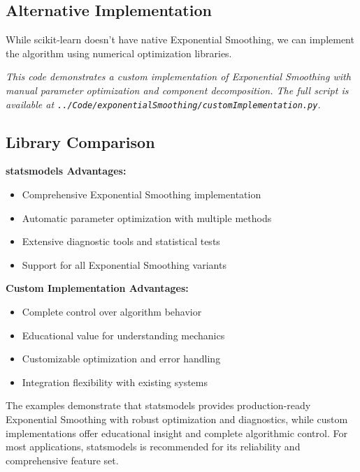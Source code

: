 \subsection{Alternative Implementation}
\label{subsec:alternative_example}

While scikit-learn doesn't have native Exponential Smoothing, we can implement the algorithm using numerical optimization libraries.


\noindent\textit{This code demonstrates a custom implementation of Exponential Smoothing with manual parameter optimization and component decomposition. The full script is available at \texttt{../Code/exponentialSmoothing/customImplementation.py}.}

\subsection{Library Comparison}
\label{subsec:library_comparison}

\textbf{statsmodels Advantages:}
\begin{itemize}
    \item Comprehensive Exponential Smoothing implementation
    \item Automatic parameter optimization with multiple methods
    \item Extensive diagnostic tools and statistical tests
    \item Support for all Exponential Smoothing variants
\end{itemize}

\textbf{Custom Implementation Advantages:}
\begin{itemize}
    \item Complete control over algorithm behavior
    \item Educational value for understanding mechanics
    \item Customizable optimization and error handling
    \item Integration flexibility with existing systems
\end{itemize}

The examples demonstrate that statsmodels provides production-ready Exponential Smoothing with robust optimization and diagnostics, while custom implementations offer educational insight and complete algorithmic control. For most applications, statsmodels is recommended for its reliability and comprehensive feature set.

